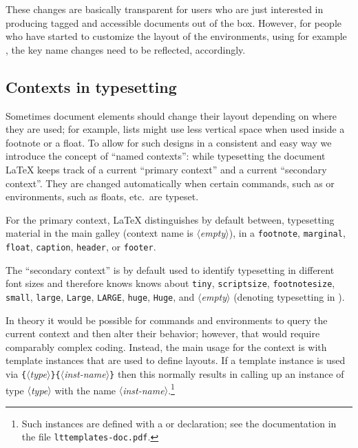 \documentclass{ltnews}
\providecommand\meta[1]{$\langle$\textrm{\itshape#1}$\rangle$}
\providecommand\Arg[1]{\texttt\{\meta{#1}\texttt\}}
\begin{document}
These changes are basically transparent for users who are just
interested in producing tagged and accessible documents out of the
box. However, for people who have started to customize the layout of the 
environments, using for example , the key
name changes need to be reflected, accordingly.


\subsection{Contexts in typesetting}

Sometimes document elements should change their layout depending on
where they are used; for example, lists might use less vertical space
when used inside a footnote or a float. To allow for such designs in a
consistent and easy way we introduce the concept of \enquote{named
  contexts}: while typesetting the document \LaTeX{} keeps track of a
current \enquote{primary context} and a current \enquote{secondary
  context}. They are changed automatically when certain commands, such
as  or environments, such as floats, etc.\ are typeset.

For the primary context, \LaTeX{} distinguishes by default between,
typesetting material in the main galley (context name is
\meta{empty}), in a \texttt{footnote}, \texttt{marginal},
\texttt{float}, \texttt{caption}, \texttt{header}, or \texttt{footer}.

The \enquote{secondary context} is by default used to identify
typesetting in different font sizes and therefore knows knows about
\texttt{tiny}, \texttt{scriptsize}, \texttt{footnotesize},
\texttt{small}, \texttt{large}, \texttt{Large}, \texttt{LARGE},
\texttt{huge}, \texttt{Huge}, and \meta{empty} (denoting typesetting
in ).

In theory it would be possible for commands and environments to query
the current context and then alter their behavior; however, that would
require comparably complex coding. Instead, the main usage for the
context is with template instances that are used to define layouts.
If a template instance is used via
\Arg{type}\Arg{inst-name} then this normally results
in calling up an instance of type \meta{type} with the name
\meta{inst-name}.\footnote{Such instances are defined with a
 or  declaration; see the
documentation in the file \texttt{lttemplates-doc.pdf}.}
\end{document}
